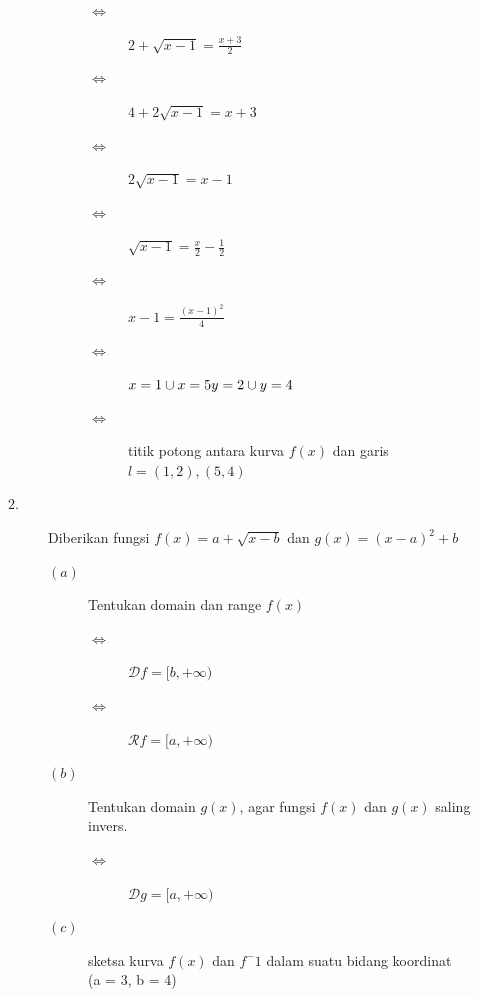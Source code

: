 \documentclass{article}
\begin{document}
\begin{description}
\begin{description}
\begin{description}
            \item[$\Leftrightarrow$] $2+\sqrt{x-1} = \frac{x+3}{2}$
            \item[$\Leftrightarrow$] $4 +2\sqrt{x-1} = x+3$
            \item[$\Leftrightarrow$] $2\sqrt{x-1} = x-1$
            \item[$\Leftrightarrow$] $\sqrt{x-1} = \frac{x}{2}-\frac{1}{2}$
            \item[$\Leftrightarrow$] $x-1 = \frac{(x-1)^2}{4}$
            \item[$\Leftrightarrow$] $x=1 \cup x = 5 \\ y = 2 \cup y = 4$
            \item[$\Leftrightarrow$] titik potong antara kurva $f(x)$ dan garis $l = (1,2),(5,4)$
        \end{description}
    \end{description}
    \item[$2.$] Diberikan fungsi $f(x)=a+\sqrt{x-b}$ dan $g(x)=(x-a)^2+b$
    \begin{description}
        \item[$(a)$] Tentukan domain dan range $f(x)$
        \begin{description}
            \item[$\Leftrightarrow$] $\mathcal{D}f = [b,+\infty)$
            \item[$\Leftrightarrow$] $\mathcal{R}f = [a,+\infty)$
        \end{description}
        \item[$(b)$] Tentukan domain $g(x)$, agar fungsi $f(x)$ dan $g(x)$ saling invers.
        \begin{description}
            \item[$\Leftrightarrow$] $\mathcal{D}g = [a,+\infty)$
        \end{description}
    \pagebreak
    \item[$(c)$]sketsa kurva $f(x)$ dan $f^-1$ dalam suatu bidang koordinat\\(a = 3, b = 4)

\end{description}
\end{description}
\end{document}
